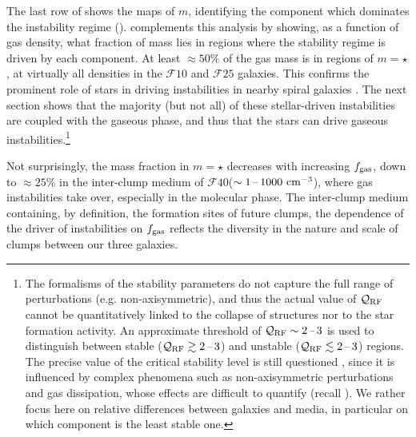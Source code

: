 \documentclass[useAMS,usenatbib]{mnras}
\newcommand{\fgas}{\ensuremath{f_{\rm gas}}\xspace}
\newcommand{\qrf}{\ensuremath{\mathcal{Q}_{\rm RF}}\xspace}
\newcommand{\gs}{\ensuremath{\mathcal{F}10}\xspace}
\newcommand{\gm}{\ensuremath{\mathcal{F}25}\xspace}
\newcommand{\gl}{\ensuremath{\mathcal{F}40}\xspace}
\begin{document}

The last row of  shows the maps of $m$, identifying the component which dominates the instability regime ().  complements this analysis by showing, as a function of gas density, what fraction of mass lies in regions where the stability regime is driven by each component. At least $\approx 50\%$ of the gas mass is in regions of $m = \star$, at virtually all densities in the \gs and \gm galaxies. This confirms the prominent role of stars in driving instabilities in nearby spiral galaxies \citep{Romeo2016, Romeo2017, Marchuk2018}. The next section shows that the majority (but not all) of these stellar-driven instabilities are coupled with the gaseous phase, and thus that the stars can drive gaseous instabilities.\footnote{The formalisms of the stability parameters do not capture the full range of perturbations (e.g. non-axisymmetric), and thus the actual value of \qrf cannot be quantitatively linked to the collapse of structures nor to the star formation activity. An approximate threshold of $\qrf \sim 2\mh 3$ is used to distinguish between stable ($\qrf \gtrsim 2\mh 3$) and unstable ($\qrf \lesssim 2\mh 3$) regions. The precise value of the critical stability level is still questioned \citep{Romeo2015}, since it is influenced by complex phenomena such as non-axisymmetric perturbations and gas dissipation, whose effects are difficult to quantify (recall ). We rather focus here on relative differences between galaxies and media, in particular on which component is the least stable one.}

Not surprisingly, the mass fraction in $m=\star$ decreases with increasing \fgas, down to $\approx 25\%$ in the inter-clump medium of \gl ($\sim 1\textrm{\,--\,} 1000 \mathrm{~cm^{-3}}$), where gas instabilities take over, especially in the molecular phase. The inter-clump medium containing, by definition, the formation sites of future clumps, the dependence of the driver of instabilities on \fgas reflects the diversity in the nature and scale of clumps between our three galaxies.
\end{document}
